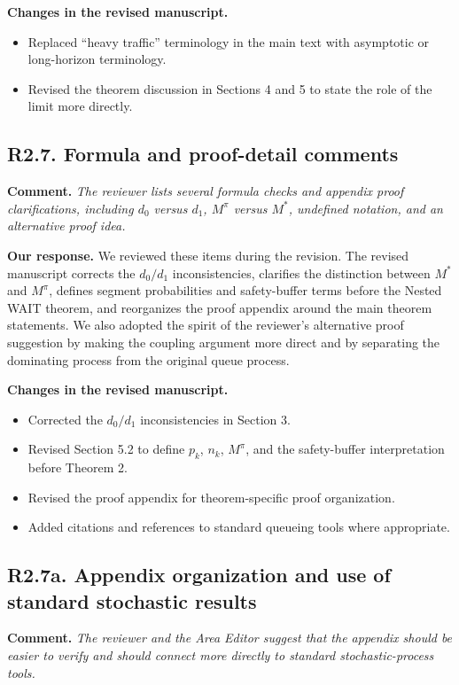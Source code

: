 \documentclass[11pt]{article}
\newcommand{\comment}[1]{%
  \vspace{0.25em}
  \noindent\textbf{Comment.} \emph{#1}
}
\newcommand{\response}{\vspace{0.25em}\noindent\textbf{Our response.} }
\newcommand{\changes}{\vspace{0.25em}\noindent\textbf{Changes in the revised manuscript.} }
\begin{document}
\changes
\begin{itemize}
    \item Replaced ``heavy traffic'' terminology in the main text with asymptotic or long-horizon terminology.
    \item Revised the theorem discussion in Sections 4 and 5 to state the role of the limit more directly.
\end{itemize}

\subsection*{R2.7. Formula and proof-detail comments}

\comment{The reviewer lists several formula checks and appendix proof clarifications, including \(d_0\) versus \(d_1\), \(M^\pi\) versus \(M^*\), undefined notation, and an alternative proof idea.}

\response We reviewed these items during the revision. The revised manuscript corrects the \(d_0/d_1\) inconsistencies, clarifies the distinction between \(M^*\) and \(M^\pi\), defines segment probabilities and safety-buffer terms before the Nested WAIT theorem, and reorganizes the proof appendix around the main theorem statements. We also adopted the spirit of the reviewer's alternative proof suggestion by making the coupling argument more direct and by separating the dominating process from the original queue process.

\changes
\begin{itemize}
    \item Corrected the \(d_0/d_1\) inconsistencies in Section 3.
    \item Revised Section 5.2 to define \(p_k\), \(n_k\), \(M^\pi\), and the safety-buffer interpretation before Theorem 2.
    \item Revised the proof appendix for theorem-specific proof organization.
    \item Added citations and references to standard queueing tools where appropriate.
\end{itemize}

\subsection*{R2.7a. Appendix organization and use of standard stochastic results}

\comment{The reviewer and the Area Editor suggest that the appendix should be easier to verify and should connect more directly to standard stochastic-process tools.}
\end{document}
